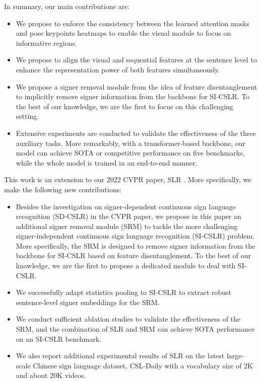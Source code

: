 \documentclass[acmsmall,screen]{acmart}
\begin{document}
In summary, our main contributions are:
\begin{itemize}
\item We propose to enforce the consistency between the learned attention masks and pose keypoints heatmaps to enable the visual module to focus on informative regions.
    \item We propose to align the visual and sequential features at the sentence level to enhance the representation power of both features simultaneously.
    \item We propose a signer removal module from the idea of feature disentanglement to implicitly remove signer information from the backbone for SI-CSLR. To the best of our knowledge, we are the first to focus on this challenging setting.
    \item Extensive experiments are conducted to validate the effectiveness of the three auxiliary tasks. More remarkably, with a transformer-based backbone, our model can achieve SOTA or competitive performance on five benchmarks, while the whole model is trained in an end-to-end manner.
\end{itemize}

This work is an extension to our 2022 CVPR paper, SLR \cite{zuo2022c2slr}. More specifically, we make the following new contributions:
\begin{itemize}
    \item Besides the investigation on signer-dependent continuous sign language recognition (SD-CSLR) in the CVPR paper, we propose in this paper an additional signer removal module (SRM) to tackle the more challenging signer-independent continuous sign language recognition (SI-CSLR) problem. More specifically, the SRM is designed to remove signer information from the backbone for SI-CSLR based on feature disentanglement. To the best of our knowledge, we are the first to propose a dedicated module to deal with SI-CSLR.
    \item We successfully adapt statistics pooling to SI-CSLR to extract robust sentence-level signer embeddings for the SRM.
    \item We conduct sufficient ablation studies to validate the effectiveness of the SRM, and the combination of SLR and SRM can achieve SOTA performance on an SI-CSLR benchmark.
    \item We also report additional experimental results of SLR on the latest large-scale Chinese sign language dataset, CSL-Daily \cite{zhou2021improving} with a vocabulary size of 2K and about 20K videos.
\end{itemize}
\end{document}
